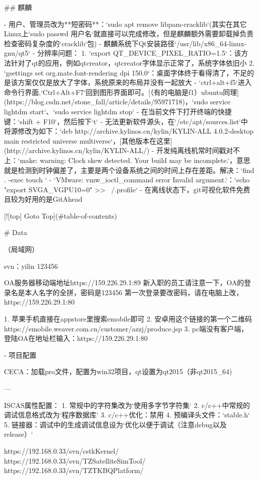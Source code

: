 ## 麒麟

- 用户、管理员改为**短密码**：`sudo apt remove libpam-cracklib`(其实在其它Linux上`sudo passwd 用户名`就直接可以完成修改，但是麒麟额外需要卸载掉负责检查密码复杂度的`cracklib`包)
- 麒麟系统下Qt安装路径`/usr/lib/x86_64-linux-gnu/qt5`
- 分辨率问题：
  1. `export QT_DEVICE_PIXEL_RATIO=1.5`：该方法针对了qt的应用，例如qtcreator，qtcreator字体显示正常了，系统字体依旧小
  2. `gsettings set org.mate.font-rendering dpi 150.0`：桌面字体终于看得清了，不足的是该方案仅仅是放大了字体，系统原来的布局并没有一起放大
- `ctrl+alt+f5`进入命令行界面,`Ctrl+Alt+F7`回到图形界面即可。[（有的电脑是f1）ubuntu同理](https://blog.csdn.net/stone_fall/article/details/95971718)，`sudo service lightdm start`、`sudo service lightdm stop`
- 在当前文件下打开终端的快捷键：`shift + F10`，然后按下`t`
- 无法更新软件源头，在`/etc/apt/sources.list`中将源修改为如下：`deb http://archive.kylinos.cn/kylin/KYLIN-ALL 4.0.2-desktop main restricted universe multiverse`，[其他版本在这里](http://archive.kylinos.cn/kylin/KYLIN-ALL/)
- 开发纯离线机常时间戳对不上：`make: warning:  Clock skew detected.  Your build may be incomplete.`，意思就是检测到时钟偏差了，主要是两个设备系统之间的时间上存在差距。解决：`find . -exec touch {} \;`
- `VMware: vmw_ioctl_command error Invalid argument.`：`echo "export SVGA_VGPU10=0" >> ~/.profile`
- 在离线状态下，git可视化软件免费且较为好用的是GitAhead


[![top] Goto Top](#table-of-contents)

# Data

（局域网）

svn：yilin
123456

OA服务器移动端地址https://159.226.29.1:89
新入职的员工请注意一下，OA的登录名是本人名字的全拼，密码是123456
第一次登录要改密码，请在电脑上改，https://159.226.29.1:80

1. 苹果手机直接在appstore里搜索emobile即可
2. 安卓用这个链接的第一个二维码https://emobile.weaver.com.cn/customer/azzj/produce.jsp
3. pc端没有客户端，登陆OA在地址栏输入：https://159.226.29.1:80


- 项目配置

CECA：加载pro文件，配置为win32项目，qt设置为qt2015（非qt2015_64)

---

ISCAS属性配置：
1. 常规中的字符集改为`使用多字节字符集`
2. c/c++中常规的调试信息格式改为`程序数据库`
3. c/c++优化：禁用
4. 预编译头文件：`stable.h`
5. 链接器：调试中的生成调试信息设为`优化以便于调试（注意debug以及release）`


https://192.168.0.33/svn/cstkKernel/
https://192.168.0.33/svn/TZSatelliteSimTool/
https://192.168.0.33/svn/TZTKBQPlatform/





